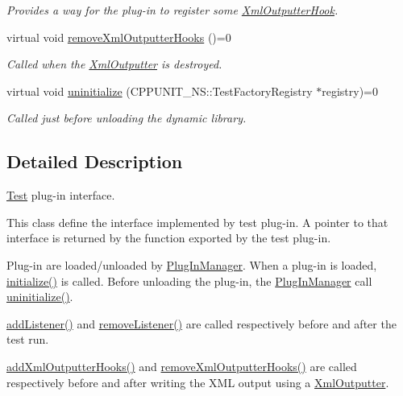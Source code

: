 \begin{DoxyCompactItemize}
\begin{DoxyCompactList}\small\item\em Provides a way for the plug-\/in to register some \hyperlink{class_xml_outputter_hook}{Xml\+Outputter\+Hook}. \end{DoxyCompactList}\item 
virtual void \hyperlink{struct_cpp_unit_test_plug_in_a045727ad9658525838b0b9157065fbcd}{remove\+Xml\+Outputter\+Hooks} ()=0
\begin{DoxyCompactList}\small\item\em Called when the \hyperlink{class_xml_outputter}{Xml\+Outputter} is destroyed. \end{DoxyCompactList}\item 
virtual void \hyperlink{struct_cpp_unit_test_plug_in_a8628d2026e76c58f715e17af88f77458}{uninitialize} (C\+P\+P\+U\+N\+I\+T\+\_\+\+N\+S\+::\+Test\+Factory\+Registry $\ast$registry)=0
\begin{DoxyCompactList}\small\item\em Called just before unloading the dynamic library. \end{DoxyCompactList}\end{DoxyCompactItemize}


\subsection{Detailed Description}
\hyperlink{class_test}{Test} plug-\/in interface.

This class define the interface implemented by test plug-\/in. A pointer to that interface is returned by the function exported by the test plug-\/in. 

Plug-\/in are loaded/unloaded by \hyperlink{class_plug_in_manager}{Plug\+In\+Manager}. When a plug-\/in is loaded, \hyperlink{struct_cpp_unit_test_plug_in_aec670330e7fced26c2a66b1dcd56edc0}{initialize()} is called. Before unloading the plug-\/in, the \hyperlink{class_plug_in_manager}{Plug\+In\+Manager} call \hyperlink{struct_cpp_unit_test_plug_in_a8628d2026e76c58f715e17af88f77458}{uninitialize()}.

\hyperlink{struct_cpp_unit_test_plug_in_aad8038dc72d0f9798379937fe5692c97}{add\+Listener()} and \hyperlink{struct_cpp_unit_test_plug_in_a8f36157014b515d38efbc8ab67923d85}{remove\+Listener()} are called respectively before and after the test run.

\hyperlink{struct_cpp_unit_test_plug_in_a547cfddd0513dc9182721f723e27d9e3}{add\+Xml\+Outputter\+Hooks()} and \hyperlink{struct_cpp_unit_test_plug_in_a045727ad9658525838b0b9157065fbcd}{remove\+Xml\+Outputter\+Hooks()} are called respectively before and after writing the X\+ML output using a \hyperlink{class_xml_outputter}{Xml\+Outputter}.

